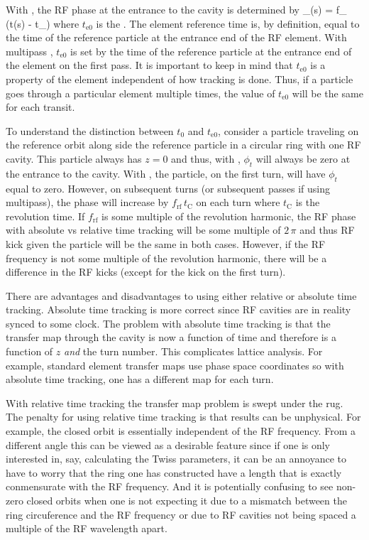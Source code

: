 With , the RF phase at the entrance to the
cavity is determined by
\Begineq
  \phi_(s) = f_ \, (t(s) - t_)
\Endeq
where $t_\text{e0}$ is the . The element reference time is, by
definition, equal to the time of the reference particle at the entrance end of the RF element. With
multipass , $t_\text{e0}$ is set by the time of the reference particle at the
entrance end of the element on the first pass. It is important to keep in mind that $t_\text{e0}$
is a property of the element independent of how tracking is done. Thus, if a particle goes through
a particular element multiple times, the value of $t_\text{e0}$ will be the same for each transit.

To understand the distinction between $t_0$ and $t_\text{e0}$, consider a particle traveling on the
reference orbit along side the reference particle in a circular ring with one RF cavity. This
particle always has $z = 0$ and thus, with , $\phi_t$ will always be zero
at the entrance to the cavity.  With , the particle, on the first turn,
will have $\phi_t$ equal to zero. However, on subsequent turns (or subsequent passes if using
multipass), the phase will increase by $f_\text{rf} \, t_\text{C}$ on each turn where $t_\text{C}$
is the revolution time. If $f_\text{rf}$ is some multiple of the revolution harmonic, the RF phase
with absolute vs relative time tracking will be some multiple of $2 \, \pi$ and thus RF kick given
the particle will be the same in both cases. However, if the RF frequency is not some multiple of
the revolution harmonic, there will be a difference in the RF kicks (except for the kick on the
first turn).

There are advantages and disadvantages to using either relative or absolute time tracking. Absolute
time tracking is more correct since RF cavities are in reality synced to some clock. The problem
with absolute time tracking is that the transfer map through the cavity is now a function of time
and therefore is a function of $z$ {\em and} the turn number. This complicates lattice analysis. For
example, standard element transfer maps use phase space coordinates so with absolute time tracking,
one has a different map for each turn.

With relative time tracking the transfer map problem is swept under the rug. The penalty for using
relative time tracking is that results can be unphysical. For example, the closed orbit is
essentially independent of the RF frequency. From a different angle this can be viewed as a desirable
feature since if one is only interested in, say, calculating the Twiss parameters, it can be an
annoyance to have to worry that the ring one has constructed have a length that is exactly
conmensurate with the RF frequency. And it is potentially confusing to see non-zero closed orbits
when one is not expecting it due to a mismatch between the ring circuference and the RF frequency or
due to RF cavities not being spaced a multiple of the RF wavelength apart.

